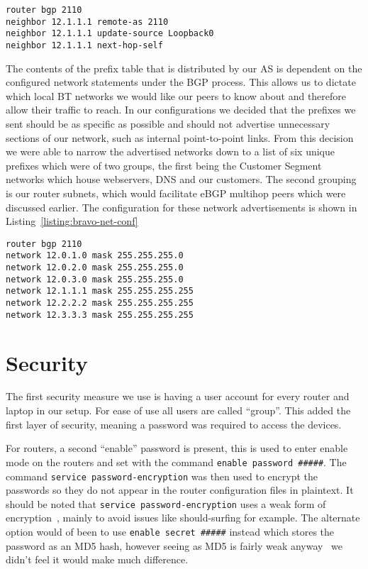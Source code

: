 \begin{lstlisting}[caption={Bravo-Alpha iBGP Configuration}, label={listing:bravo-ibgp-conf}]
router bgp 2110
neighbor 12.1.1.1 remote-as 2110
neighbor 12.1.1.1 update-source Loopback0
neighbor 12.1.1.1 next-hop-self
\end{lstlisting}

The contents of the prefix table that is distributed by our AS is dependent on
the configured network statements under the BGP process. This allows us to
dictate which local BT networks we would like our peers to know about and
therefore allow their traffic to reach. In our configurations we decided that
the prefixes we sent should be as specific as possible and should not advertise
unnecessary sections of our network, such as internal point-to-point links. From
this decision we were able to narrow the advertised networks down to a list of
six unique prefixes which were of two groups, the first being the Customer
Segment networks which house webservers, DNS and our customers. The second
grouping is our router subnets, which would facilitate eBGP multihop peers which
were discussed earlier. The configuration for these network advertisements is
shown in Listing~\ref{listing:bravo-net-conf}

\begin{lstlisting}[caption={Bravo BGP Network Configuration}, label={listing:bravo-net-conf}]
router bgp 2110
network 12.0.1.0 mask 255.255.255.0
network 12.0.2.0 mask 255.255.255.0
network 12.0.3.0 mask 255.255.255.0
network 12.1.1.1 mask 255.255.255.255
network 12.2.2.2 mask 255.255.255.255
network 12.3.3.3 mask 255.255.255.255
\end{lstlisting}

\section{Security}
The first security measure we use is having a user account for every router and
laptop in our setup. For ease of use all users are called ``group''. This added
the first layer of security,  meaning a password was required to access the
devices.

For routers, a second ``enable'' password is present, this is used to enter
enable mode on the routers and set with the command \texttt{enable password
\#\#\#\#\#}. The command \texttt{service password-encryption} was then used to
encrypt the passwords so they do not appear in the router configuration files in
plaintext. It should be noted that \texttt{service password-encryption} uses a
weak form of encryption~\cite{ciscocracker}, mainly to avoid issues like
should-surfing for example. The alternate option would of been to use
\texttt{enable secret \#\#\#\#\#} instead which stores the password as an MD5
hash, however seeing as MD5 is fairly weak anyway~\cite{md5} we didn't feel it
would make much difference.

